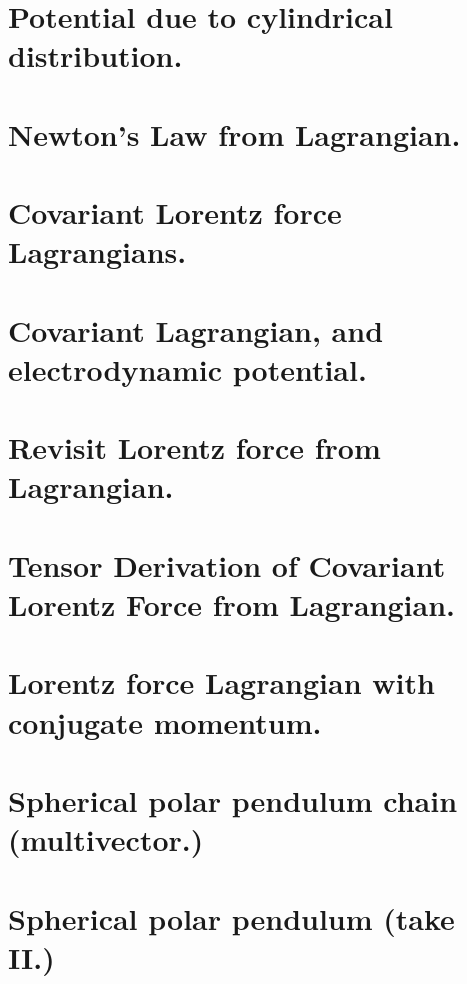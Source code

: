 \chapter{Potential due to cylindrical distribution.}
   
\chapter{Newton's Law from Lagrangian.}
\chapter{Covariant Lorentz force Lagrangians.}
   
\chapter{Covariant Lagrangian, and electrodynamic potential.}
\chapter{Revisit Lorentz force from Lagrangian.}
\chapter{Tensor Derivation of Covariant Lorentz Force from Lagrangian.}
\chapter{Lorentz force Lagrangian with conjugate momentum.}
\chapter{Spherical polar pendulum chain (multivector.)}
   
\chapter{Spherical polar pendulum (take II.)}
   

\EndNoBibArticle
